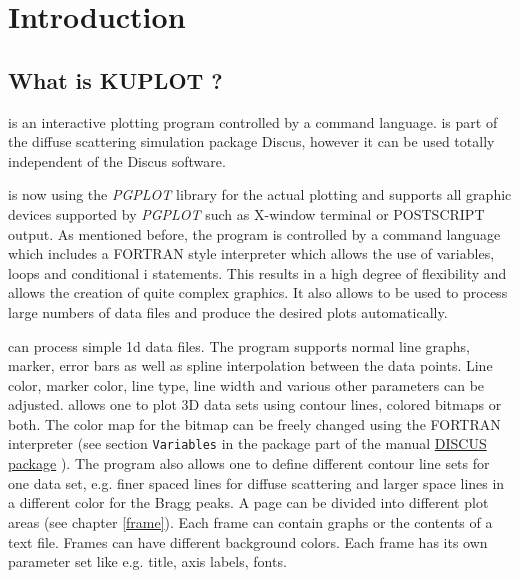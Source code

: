 
\chapter{Introduction}
\section{What is KUPLOT ?}

\Kuplot is an interactive plotting program controlled by a
command language.  \Kuplot is part of the diffuse scattering
simulation package {\sc Discus}, however it can be used totally
independent of the {\sc Discus} software.  \par

\Kuplot is now using the {\it PGPLOT} library for the actual
plotting and supports all graphic devices supported by {\it
PGPLOT} such as X-window terminal or POSTSCRIPT output. As
mentioned before, the program is controlled by a command language
which includes a FORTRAN style interpreter which allows the use of
variables, loops and conditional i statements. This results in a
high degree of flexibility and allows the creation of quite
complex graphics. It also allows \Kuplot to be used to
process large numbers of data files and produce the desired plots
automatically. \par

\Kuplot can process simple 1d data files.  The program
supports normal line graphs, marker, error bars as well as spline
interpolation between the data points.  Line color, marker color,
line type, line width and various other parameters can be
adjusted.  \Kuplot allows one to plot 3D data sets using
contour lines, colored bitmaps or both.  The color map for the
bitmap can be freely changed using the FORTRAN interpreter (see
section {\tt Variables} in the package part of the manual
\href{./package\_man.pdf}{DISCUS package} 
).  The program also allows one to define
different contour line sets for one data set, e.g.  finer spaced
lines for diffuse scattering and larger space lines in a different
color for the Bragg peaks. A page can be divided into different
plot areas (see chapter \ref{frame}). Each frame can contain
graphs or the contents of a text file.  Frames can have different
background colors.  Each frame has its own parameter set like e.g.
title, axis labels, fonts.  \par

